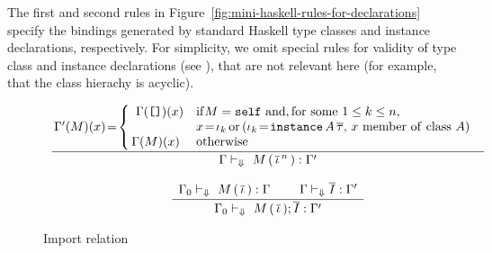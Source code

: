 The first and second rules in
Figure~\ref{fig:mini-haskell-rules-for-declarations} specify the
bindings generated by standard Haskell type classes and instance
declarations, respectively.  For simplicity, we omit special rules for
validity of type class and instance declarations (see \cite{GHC}),
that are not relevant here (for example, that the class hierachy is
acyclic).

\begin{figure}
\[ \begin{array}{cc}
	\displaystyle\frac
	 {\begin{array}{ll}
            \!\!\Gamma'(M)(x)\! = \!\left\{ \begin{array}{ll}
              \Gamma(\mbox{\tt{[]}})(x) & \mathrm{ if } M = \self\ \mathrm{ and, for\ some\ } 1 \leq k \leq n,\\
              & x\! = \! \iota_k
                    \,\mathrm{or}\, (\iota_k\! =\! \instance\ \!A\, \overline{\tau},\, x \mathrm{\ member\ of\ class\ } A)\\
               \!\!\Gamma(M)(x)          & \mathrm{ otherwise}
             \end{array}\right.
          \end{array}}
	 {\Gamma \vdash_{\Downarrow} \ M\, (\,\overline{\iitem}^{\,n}\,) : \Gamma'}  \\ \\
	\displaystyle\frac
	 {\begin{array}{ll}
	   \Gamma_0 \vdash_{\Downarrow} \ M\, (\,\overline{\iitem}\,) : \Gamma \:\:\: & \:\:\: 
           \Gamma \vdash_{\Downarrow} \overline{\importC} : \Gamma'
          \end{array}}
	 {\Gamma_0 \vdash_{\Downarrow} \ M\, (\,\overline{\iitem}\,); \overline{\importC} : \Gamma'} 
\end{array} \]
\caption{Import relation}
\label{fig:import-relation}
\end{figure} 

